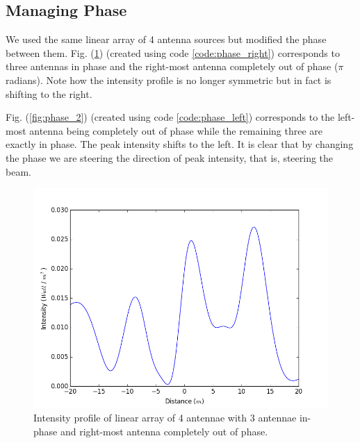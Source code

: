 \subsection{Managing Phase}

We used the same linear array of 4 antenna sources but modified the phase between them. Fig. (\ref{fig:phase_1}) (created using code \ref{code:phase_right}) corresponds to three antennas in phase and the right-most antenna completely out of phase ($\pi$ radians). Note how the intensity profile is no longer symmetric but in fact is shifting to the right. 

Fig. (\ref{fig:phase_2}) (created using code \ref{code:phase_left}) corresponds to the left-most antenna being completely out of phase while the remaining three are exactly in phase. The peak intensity shifts to the left. It is clear that by changing the phase we are steering the direction of peak intensity, that is, steering the beam.

\begin{figure}[!h]
	\centering	
	\includegraphics[scale=0.45]{figure_4.png}
    \caption{\label{fig:phase_1} Intensity profile of linear array of 4 antennae with 3 antennae in-phase and right-most antenna completely out of phase.}
\end{figure}

